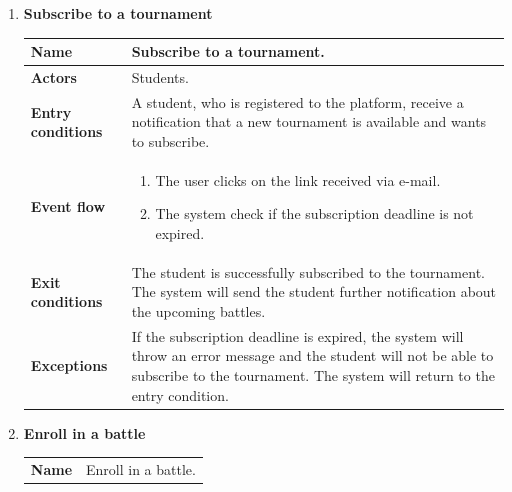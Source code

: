 \begin{enumerate}[label=\textbf{UC.\arabic*}]
\begin{table}[H]
        \end{table}
        \item {} \textbf{Subscribe to a tournament}
        \begin{table}[H]
    	    \centering
                \renewcommand{\arraystretch}{1.5}
                \begin{tabular}{|m{3.2cm}|m{9.8cm}|}
                    \hline
                    \textbf{Name} & Subscribe to a tournament.\\
                    \hline
                    \textbf{Actors} & Students. \\
                    \hline
                    \textbf{Entry conditions}  & A student, who is registered to the platform, receive a notification that a new tournament is available and wants to subscribe.\\
                    \hline
                    \textbf{Event flow}  & 
                    \begin{enumerate}[label=\arabic*.]
                        \item The user clicks on the link received via e-mail.
                        \item The system check if the subscription deadline is not expired.
                    \end{enumerate}\\ 
                    \hline
                    \textbf{Exit conditions}  & The student is successfully subscribed to the tournament. The system will send the student further notification about the upcoming battles. \\
                    \hline
                    \textbf{Exceptions}  & If the subscription deadline is expired, the system will throw an error message and the student will not be able to subscribe to the tournament. The system will return to the entry condition. \\
                    \hline 
                \end{tabular}
        \end{table}
        \item {} \textbf{Enroll in a battle}
        \begin{table}[H]
    	    \centering
                \renewcommand{\arraystretch}{1.5}
                \begin{tabular}{|m{3.2cm}|m{9.8cm}|}
                    \hline
                    \textbf{Name} & Enroll in a battle. \\

\end{tabular}
\end{table}
\end{enumerate}
